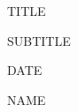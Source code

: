 \documentclass[a4paper]{ltjsarticle}
\title{}
\author{}
\date{\Filemodtoday{\jobname}}
\numberwithin{equation}{section}
\begin{document}
\begin{center}
    \huge TITLE\par
    \vspace{15mm}
    \LARGE SUBTITLE \par
    \vspace{150mm}
    \Large DATE \par
    \vspace{15mm}
    \Large NAME \par
    \vspace{10mm}
    \Large 
    \vspace{10mm}
\end{center}
\thispagestyle{empty}
\clearpage
\addtocounter{page}{-1}
%
%
%
%
\end{document}
